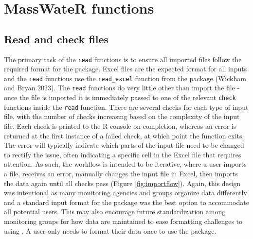 \hypertarget{masswater-functions}{%
\section{MassWateR functions}\label{masswater-functions}}

\hypertarget{read-and-check-files}{%
\subsection{Read and check files}\label{read-and-check-files}}

The primary task of the \texttt{read} functions is to ensure all imported files follow the required format for the package. Excel files are the expected format for all inputs and the \texttt{read} functions use the \texttt{read\_excel} function from the  package (Wickham and Bryan 2023). The \texttt{read} functions do very little other than import the file - once the file is imported it is immediately passed to one of the relevant \texttt{check} functions inside the \texttt{read} function. There are several checks for each type of input file, with the number of checks increasing based on the complexity of the input file. Each check is printed to the R console on completion, whereas an error is returned at the first instance of a failed check, at which point the function exits. The error will typically indicate which parts of the input file need to be changed to rectify the issue, often indicating a specific cell in the Excel file that requires attention. As such, the workflow is intended to be iterative, where a user imports a file, receives an error, manually changes the input file in Excel, then imports the data again until all checks pass (Figure \ref{fig:importflow}). Again, this design was intentional as many monitoring agencies and groups organize data differently and a standard input format for the package was the best option to accommodate all potential users. This may also encourage future standardization among monitoring groups for how data are maintained to ease formatting challenges to using . A user only needs to format their data once to use the package.

